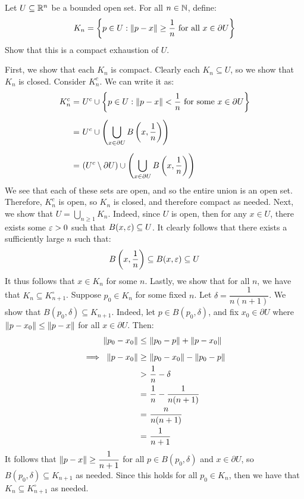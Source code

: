 \documentclass{article}
\begin{document}
\newpage
{}

\begin{qu}
    Let $ U \subseteq \mathbb{R}^{n} $ be a bounded open set. For all $ n \in \mathbb{N} $, define:
    \begin{equation*}
        K_{n} = \left\{{p \in U : \|p - x\| \geq \frac{1}{n} \textrm{ for all } x \in \partial U}\right\}
    \end{equation*}
    Show that this is a compact exhaustion of $ U $.
\end{qu}

\begin{soln}
    First, we show that each $ K_{n} $ is compact.
    Clearly each $ K_{n} \subseteq U $, so we show that $ K_{n} $ is closed.
    Consider $ K_{n}^{c} $. We can write it as:
    \begin{align*}
        K_{n}^{c} = \ & U^{c} \cup \set{p \in U: \norm{p - x} <
        \frac{1}{n} \trm{ for some } x \in \partial U} \vsp
        = \ & U^{c} \cup \left( \bigcup_{x \in \partial U}
        B \left( x, \frac{1}{n} \right) \right) \vsp
        = \ & (U^{c} \setminus \partial U) \cup \left( \bigcup_{x \in \partial U}
        B \left( x, \frac{1}{n} \right) \right)
    \end{align*}
    We see that each of these sets are open, and so the entire union is an open set.
    Therefore, $ K_{n}^{c} $ is open, so $ K_{n} $ is closed, and therefore compact as needed. \vsp
    Next, we show that $ U = \bigcup_{n \geq 1}K_{n} $.
    Indeed, since $ U $ is open, then for any $ x \in U $, there exists some $ \operatorname{\varepsilon} > 0 $ such that
    $ B(x, \operatorname{\varepsilon}) \subseteq U $. It clearly follows that there exists a sufficiently large $ n $
    such that:
    \begin{equation*}
        B \left( x, \frac{1}{n} \right) \subseteq B(x, \operatorname{\varepsilon}) \subseteq U
    \end{equation*}
    It thus follows that $ x \in K_{n} $ for some $ n $. \vsp
    Lastly, we show that for all $ n $, we have that $ K_{n} \subseteq K_{n+1}^{\circ} $.
    Suppose $ p_{0} \in K_{n} $ for some fixed $ n $. \vsp
    Let $ \delta = \dfrac{1}{n(n+1)} $. We show that $ B(p_{0}, \delta) \subseteq K_{n+1} $.
    Indeed, let $ p \in B(p_{0}, \delta) $, and fix $ x_{0} \in \partial U $ where
    $ \|p - x_{0}\| \leq \|p - x\| $ for all $ x \in \partial U $. Then:
    \begin{align*}
        \norm{p_{0} - x_{0}} \leq \ & \norm{p_{0} - p} + \norm{p - x_{0}} \vsp
        \implies \ \norm{p - x_{0}} \geq \ & \norm{p_{0} - x_{0}} - \norm{p_{0} - p} \\
        > \ & \frac{1}{n} - \delta \\
        = \ & \frac{1}{n} - \frac{1}{n(n+1)} \\
        = \ & \frac{n}{n(n+1)} \\
        = \ & \frac{1}{n+1}
    \end{align*}
    It follows that $ \|p - x\| \geq \dfrac{1}{n+1} $ for all $ p \in B(p_{0}, \delta) $ and
    $ x \in \partial U $, so $ B(p_{0}, \delta) \subseteq K_{n+1} $ as needed. \vsp
    Since this holds for all $ p_{0} \in K_{n} $,
    then we have that $ K_{n} \subseteq K_{n+1}^{\circ} $ as needed.
\end{soln}
\end{document}

